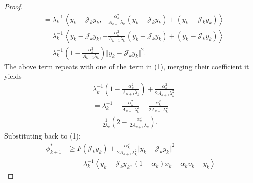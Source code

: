 \documentclass[12pt]{article}
\begin{document}
\begin{proof}
\begin{align*}
                &= 
                \lambda_k^{-1}
                    \left\langle
                        y_k - \mathcal J_k y_k,
                        -\frac{\alpha_k^2}{A_{k + 1}\lambda_k}(y_k - \mathcal J_k y_k)
                        + 
                        (y_k - \mathcal J_k y_k)
                    \right\rangle
                \\
                &= 
                \lambda_k^{-1}
                    \left\langle
                        y_k - \mathcal J_k y_k,
                        -\frac{\alpha_k^2}{A_{k + 1}\lambda_k}(y_k - \mathcal J_k y_k)
                        + 
                        (y_k - \mathcal J_k y_k)
                    \right\rangle
                \\
                &=
                \lambda_k^{-1} 
                \left(
                    1 - \frac{\alpha_k^2}{A_{k + 1}\lambda_k}
                \right)
                \Vert y_k - \mathcal J_k y_k\Vert^2. 
            \end{align*}
            The above term repeats with one of the term in (1), merging their coefficient it yields
            \begin{align*}
                & 
                \lambda_k^{-1} 
                \left(
                    1 - \frac{\alpha_k^2}{A_{k + 1}\lambda_k}
                \right) + 
                \frac{\alpha_k^2}{2A_{k + 1} \lambda_k^2}
                \\
                & = 
                \lambda_k^{-1}
                - 
                \frac{\alpha_k^2}{A_{k + 1}\lambda_k^2}
                + 
                \frac{\alpha_k^2}{2A_{k + 1}\lambda_k^2} 
                \\
                &= 
                \frac{1}{2\lambda_k}
                \left(
                    2 - \frac{\alpha_k^2}{2A_{k + 1}\lambda_k}
                \right). 
            \end{align*}
            Substituting back to (1): 
            \begin{align*}
                \phi_{k + 1}^* 
                &\ge 
                F(\mathcal J_k y_k)
                + \frac{\alpha_k^2}{2A_{k + 1} \lambda_k^2}
                \Vert y_k - \mathcal J_ky_k\Vert^2
                \\
                    & \quad 
                    + 
                    \lambda_k^{-1}
                    \left\langle 
                        y_k - \mathcal J_k y_k, 
                        (1 - \alpha_k)x_k + \alpha_k v_k - y_k
                    \right\rangle

\end{align*}
\end{proof}
\end{document}
